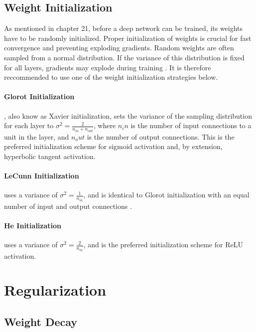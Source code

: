 \documentclass{article}
\begin{document}
\subsection{Weight Initialization} %

As mentioned in chapter 21, before a deep network can be trained, its weights have to be randomly initialized. Proper initialization of weights is crucial for fast convergence and preventing exploding gradients. Random weights are often sampled from a normal distribution. If the variance of this distribution is fixed for all layers, gradients may explode during training \cite{pml1book}. It is therefore reccommended to use one of the weight initialization strategies below.

\paragraph*{Glorot Initialization}, also know as Xavier initialization, sets the variance of the sampling distribution for each layer to \(\sigma^2 = \frac{2}{n_{in} + n_{out}}\), where \(n_in\) is the number of input connections to a unit in the layer, and \(n_out\) is the number of output connections. This is the preferred initialization scheme for sigmoid activation \cite{pml1book} and, by extension, hyperbolic tangent activation.

\paragraph*{LeCunn Initialization} uses a variance of \(\sigma^2 = \frac{1}{n_{in}}\), and is identical to Glorot initialization with an equal number of input and output connections \cite{pml1book}.

\paragraph*{He Initialization} uses a variance of \(\sigma^2 = \frac{2}{n_{in}}\), and is the preferred initialization scheme for ReLU activation. 

\section{Regularization} %

\subsection{Weight Decay} %
\end{document}
